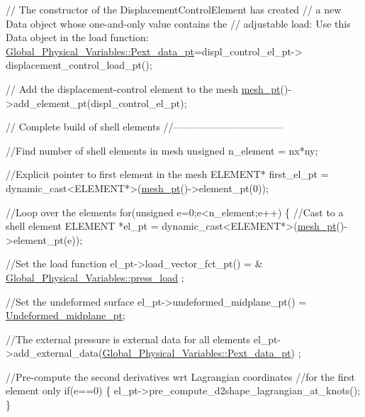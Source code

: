 \begin{DoxyCodeInclude}
 \textcolor{comment}{// The constructor of the  DisplacementControlElement has created}
 \textcolor{comment}{// a new Data object whose one-and-only value contains the}
 \textcolor{comment}{// adjustable load: Use this Data object in the load function:}
 \hyperlink{namespaceGlobal__Physical__Variables_ae5107b48f68b31302f3d37b038739904}{Global\_Physical\_Variables::Pext\_data\_pt}=displ\_control\_el\_pt->
  displacement\_control\_load\_pt();
 
 \textcolor{comment}{// Add the displacement-control element to the mesh}
 \hyperlink{classShellProblem_a1905a1b913469ed54f7c8f55d133ff57}{mesh\_pt}()->add\_element\_pt(displ\_control\_el\_pt); 

 

 \textcolor{comment}{// Complete build of shell elements}
 \textcolor{comment}{//---------------------------------}

 \textcolor{comment}{//Find number of shell elements in mesh}
 \textcolor{keywordtype}{unsigned} n\_element = nx*ny;

 \textcolor{comment}{//Explicit pointer to first element in the mesh}
 ELEMENT* first\_el\_pt = \textcolor{keyword}{dynamic\_cast<}ELEMENT*\textcolor{keyword}{>}(\hyperlink{classShellProblem_a1905a1b913469ed54f7c8f55d133ff57}{mesh\_pt}()->element\_pt(0));
 
 \textcolor{comment}{//Loop over the elements }
 \textcolor{keywordflow}{for}(\textcolor{keywordtype}{unsigned} e=0;e<n\_element;e++)
  \{
   \textcolor{comment}{//Cast to a shell element}
   ELEMENT *el\_pt = \textcolor{keyword}{dynamic\_cast<}ELEMENT*\textcolor{keyword}{>}(\hyperlink{classShellProblem_a1905a1b913469ed54f7c8f55d133ff57}{mesh\_pt}()->element\_pt(e));

   \textcolor{comment}{//Set the load function}
   el\_pt->load\_vector\_fct\_pt() = & \hyperlink{namespaceGlobal__Physical__Variables_a86fd8f502cb8c4c7939ffae742f023eb}{Global\_Physical\_Variables::press\_load}
      ;

   \textcolor{comment}{//Set the undeformed surface}
   el\_pt->undeformed\_midplane\_pt() = \hyperlink{classShellProblem_a1c9e4492c7c7c2716fdf8b812ec41651}{Undeformed\_midplane\_pt};

   \textcolor{comment}{//The external pressure is external data for all elements}
   el\_pt->add\_external\_data(\hyperlink{namespaceGlobal__Physical__Variables_ae5107b48f68b31302f3d37b038739904}{Global\_Physical\_Variables::Pext\_data\_pt})
      ;
   
   \textcolor{comment}{//Pre-compute the second derivatives wrt Lagrangian coordinates}
   \textcolor{comment}{//for the first element only}
   \textcolor{keywordflow}{if}(e==0)
    \{
     el\_pt->pre\_compute\_d2shape\_lagrangian\_at\_knots();
    \}


\end{DoxyCodeInclude}
